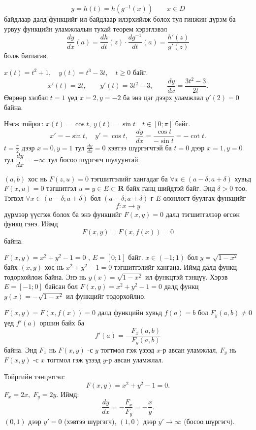 \begin{prof} $$y=h(t)=h(g^{-1}(x))\qquad x\in D$$ байдлаар далд функцийг ил байдлаар илэрхийлж болох тул гинжин дүрэм ба урвуу функцийн уламжлалын тухай теорем хэрэглэвэл 
$$\dfrac{dy}{dx}(a)=\dfrac{dh}{dt}(z)\cdot \dfrac{dg^{-1}}{dt}(a)=\dfrac{h'(z)}{g'(z)}$$ болж батлагав.
\end{prof}
\begin{example}
$x(t)=t^2+1,\quad y(t)=t^3-3t ,\quad t\geq 0$ байг. 
\[
x'(t)=2t,\qquad y'(t)=3t^2-3,\qquad
\frac{dy}{dx}=\frac{3t^2-3}{2t}.
\] Өөрөөр хэлбэл $t=1$ үед $x=2, y=-2$ ба энэ цэг дээрх уламжлал $y'(2)=0$ байна.  
\end{example}
\begin{example}
Нэгж тойрог: $x(t)=\cos t,\ y(t)=\sin t \quad t\in [0;\pi]$ байг.
\[
x'=-\sin t,\quad y'=\cos t,\quad
\frac{dy}{dx}=\frac{\cos t}{-\sin t}=-\cot t.
\]
$t=\frac{\pi}{2}$ дээр $x=0, y=1$ тул $\frac{dy}{dx}=0$ хэвтээ шүргэгчтэй ба $t=0$ дээр $x=1,y=0$ тул $\dfrac{dy}{dx}=-\infty$ тул босоо шүргэгч шулуунтай.
\end{example}
\begin{definition}  $(a,b)$ хос нь 
$F(z,u)=0$ тэгшитгэлийг хангадаг ба $\forall x\in (a-\delta;a+\delta)$ хувьд $F(x,u)=0$ тэгшитгэл $u=y\in E\subset\mathbf{R}$ байх ганц шийдтэй байг. Энд $\delta>0$ тоо. Тэгвэл  $\forall x\in (a-\delta;a+\delta)$ бол $(a-\delta;a+\delta)$-г $E$ олонлогт буулгах функцийг $$f: x\to y$$ дүрмээр үүсгэж болох ба энэ функцийг $F(x,y)=0$ далд тэгшитгэлээр өгсөн функц гэнэ. Иймд $$F(x,y)=F(x,f(x))=0$$ байна. 
\end{definition}
\begin{example}
$F(x,y)=x^2+y^2-1=0$ , $E=[0;1]$ байг. $x\in (-1;1)$ бол $y=\sqrt{1-x^2}$ байх $(x,y)$ хос нь $x^2+y^2-1=0$  тэгшитгэлийг хангана. Иймд далд функц тодорхойлож байна. Энэ нь $y(x)=\sqrt{1-x^2}$ ил функцтэй тэнцүү. Хэрэв $E=[-1;0]$ байсан бол $F(x,y)=x^2+y^2-1=0$ далд функц $y(x)=-\sqrt{1-x^2}$ ил функцийг тодорхойлно.
\end{example}
\begin{theorem}
$F(x,y)=F(x,f(x))=0$ далд функцийн хувьд $f(a)=b$ бол $F_y(a,b)\neq 0$ үед $f'(a)$ оршин байх ба 
$$f'(a)=-\dfrac{F_x(a,b)}{F_y(a,b)}$$ байна. Энд $F_x$ нь $F(x,y)$ -с $y$ тогтмол гэж үзээд  $x$-р авсан уламжлал, $F_y$ нь $F(x,y)$ -с $x$ тогтмол гэж үзээд  $y$-р авсан уламжлал.
\end{theorem}
\begin{example}
Тойргийн тэнцэтгэл:
\[
F(x,y)=x^2+y^2-1=0.
\]
$F_x = 2x, \; F_y = 2y$.  
Иймд:
\[
\frac{dy}{dx}=-\frac{F_x}{F_y}=-\frac{x}{y}.
\]
$(0,1)$ дээр $y'=0$ (хэвтээ шүргэгч), $(1,0)$ дээр $y'\to\infty$ (босоо шүргэгч).
\end{example}
